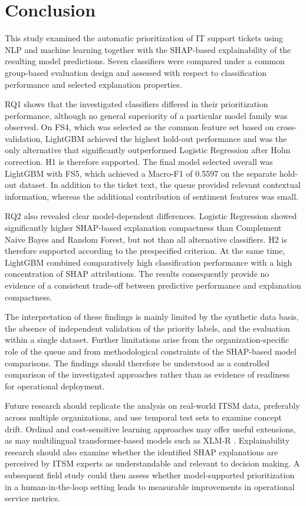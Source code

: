 \section{Conclusion}

This study examined the automatic prioritization of IT support tickets using
NLP and machine learning together with the SHAP-based explainability of the
resulting model predictions. Seven classifiers were compared under a common
group-based evaluation design and assessed with respect to classification
performance and selected explanation properties.

RQ1 shows that the investigated classifiers differed in their prioritization
performance, although no general superiority of a particular model family was
observed. On FS4, which was selected as the common feature set based on
cross-validation, LightGBM achieved the highest hold-out performance and was
the only alternative that significantly outperformed Logistic Regression after
Holm correction. H1 is therefore supported. The final model selected overall
was LightGBM with FS5, which achieved a Macro-F1 of 0.5597 on the separate
hold-out dataset. In addition to the ticket text, the queue provided relevant
contextual information, whereas the additional contribution of sentiment
features was small.

RQ2 also revealed clear model-dependent differences. Logistic Regression
showed significantly higher SHAP-based explanation compactness than Complement
Naive Bayes and Random Forest, but not than all alternative classifiers. H2 is
therefore supported according to the prespecified criterion. At the same time,
LightGBM combined comparatively high classification performance with a high
concentration of SHAP attributions. The results consequently provide no
evidence of a consistent trade-off between predictive performance and
explanation compactness.

The interpretation of these findings is mainly limited by the synthetic data
basis, the absence of independent validation of the priority labels, and the
evaluation within a single dataset. Further limitations arise from the
organization-specific role of the queue and from methodological constraints
of the SHAP-based model comparisons. The findings should therefore be
understood as a controlled comparison of the investigated approaches rather
than as evidence of readiness for operational deployment.

Future research should replicate the analysis on real-world ITSM data,
preferably across multiple organizations, and use temporal test sets to examine
concept drift. Ordinal and cost-sensitive learning approaches may offer useful
extensions, as may multilingual transformer-based models such as
XLM-R \cite{conneau2020xlmr}. Explainability research should also examine whether the
identified SHAP explanations are perceived by ITSM experts as understandable
and relevant to decision making. A subsequent field study could then assess
whether model-supported prioritization in a human-in-the-loop setting leads to
measurable improvements in operational service metrics.